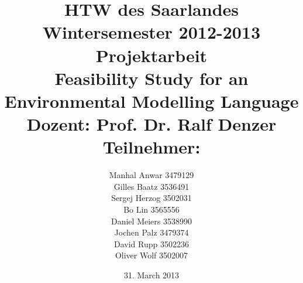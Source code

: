 


\title{%
\large HTW des Saarlandes\\
Wintersemester 2012-2013\\
Projektarbeit\\[10mm]
{\LARGE Feasibility Study for an Environmental Modelling Language}\\[10mm]
Dozent: Prof. Dr. Ralf Denzer\\[10mm]Teilnehmer:
}

\author{%
Manhal Anwar 3479129\\[2mm]
Gilles Baatz 3536491\\[2mm]
Sergej Herzog 3502031\\[2mm]
Bo Lin 3565556\\[2mm]
Daniel Meiers 3538990\\[2mm]
Jochen Palz 3479374\\[5mm]
David Rupp 3502236\\[2mm]
Oliver Wolf 3502007\\[2mm]
}

\date{31. March 2013}



\maketitle

\tableofcontents
\listoffigures


 










\printbibliography


